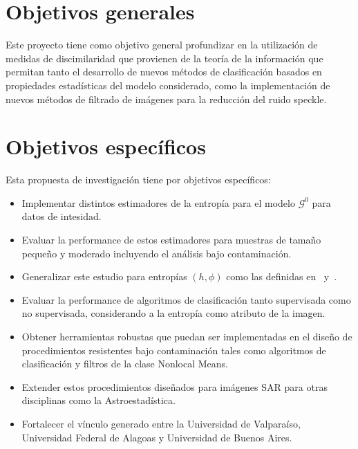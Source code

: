 \documentclass[11pt]{article}
\begin{document}
\section{Objetivos generales}



Este proyecto tiene como objetivo general profundizar en la utilización de medidas de discimilaridad que provienen de la teoría de la información que permitan tanto el desarrollo de nuevos métodos de clasificación basados en propiedades estadísticas del modelo considerado, como la implementación de nuevos métodos de filtrado de imágenes para la reducción del ruido speckle.

\section{Objetivos específicos}

Esta propuesta de investigación tiene por objetivos específicos:
\begin{itemize}
	\item Implementar distintos estimadores de la entropía para el modelo $\mathcal{G}^0$ para datos de intesidad.
	\item Evaluar la performance de estos estimadores para muestras de tamaño pequeño y moderado incluyendo el análisis bajo contaminación.
	\item Generalizar este estudio para entropías $(h,\phi)$ como las definidas en~\cite{Menendez1997} y~\cite{Salicru1994}. 
	\item Evaluar la performance de algoritmos de clasificación tanto supervisada como no supervisada, considerando a la entropía como atributo de la imagen.
	\item Obtener herramientas robustas que puedan ser implementadas en el diseño de procedimientos resistentes bajo contaminación tales como algoritmos de clasificación y filtros de la clase Nonlocal Means.
	\item Extender estos procedimientos diseñados para imágenes SAR para otras disciplinas como la Astroestadística.
	\item Fortalecer el vínculo generado entre la Universidad de Valparaíso, Universidad Federal de Alagoas y Universidad de Buenos Aires.
\end{itemize}
\end{document}
